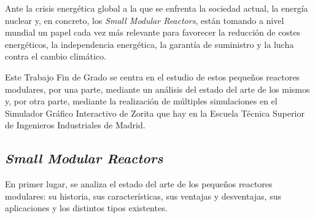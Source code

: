 \documentclass[a4paper, 11pt, spanish, twoside]{article}
\begin{document}
Ante la crisis energética global a la que se enfrenta la sociedad actual, la energía nuclear y, en concreto, los \textit{Small Modular Reactors}, están tomando a nivel mundial un papel cada vez más relevante para favorecer la reducción de costes energéticos, la independencia energética, la garantía de suministro y la lucha contra el cambio climático.

Este Trabajo Fin de Grado se centra en el estudio de estos pequeños reactores modulares, por una parte, mediante un análisis del estado del arte de los mismos y, por otra parte, mediante la realización de múltiples simulaciones en el Simulador Gráfico Interactivo de Zorita que hay en la Escuela Técnica Superior de Ingenieros Industriales de Madrid.

\subsection*{\textit{Small Modular Reactors}}

En primer lugar, se analiza el estado del arte de los pequeños reactores modulares: su historia, sus características, sus ventajas y desventajas, sus aplicaciones y los distintos tipos existentes.
\end{document}
